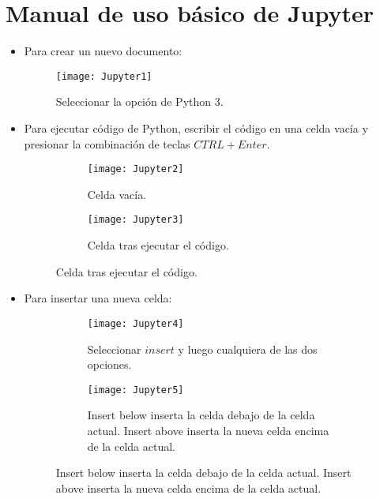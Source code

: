 \documentclass{article}
\begin{document}
        \section{Manual de uso b\'{a}sico de Jupyter}
            \begin{itemize}
                \item Para crear un nuevo documento:
                \begin{figure}[H]
                    \centering
                    \texttt{[image: Jupyter1]}
                    \caption{Seleccionar la opci\'{o}n de Python 3.}
                \end{figure}

                \item Para ejecutar c\'{o}digo de Python, escribir el c\'{o}digo en una celda
                vac\'{i}a y presionar la combinaci\'{o}n de teclas $CTRL+Enter$.

                \begin{figure}[H]
                    \begin{subfigure}{0.5\textwidth}
                        \texttt{[image: Jupyter2]}
                        \caption{Celda vac\'{i}a.}
                    \end{subfigure}
                    \begin{subfigure}{0.5\textwidth}
                        \texttt{[image: Jupyter3]}
                        \caption{Celda tras ejecutar el c\'{o}digo.}
                    \end{subfigure}
                \end{figure}

                \item Para insertar una nueva celda:
                \begin{figure}[H]
                    \begin{subfigure}{0.5\textwidth}
                        \texttt{[image: Jupyter4]}
                        \caption{Seleccionar $insert$ y luego cualquiera de las dos opciones.}
                    \end{subfigure}
                    \begin{subfigure}{0.5\textwidth}
                        \texttt{[image: Jupyter5]}
                        \caption{Insert below inserta la celda debajo de la celda actual. Insert above
                        inserta la nueva celda encima de la celda actual.}
                    \end{subfigure}
                \end{figure}


\end{itemize}
\end{document}
